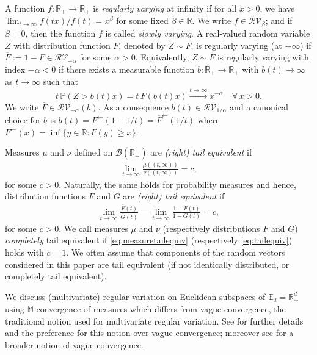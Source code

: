 \documentclass[aos]{imsart}
\numberwithin{equation}{section}
\theoremstyle{plain} %
\theoremstyle{remark}
\newcommand{\E}{\mathbb{E}}
\newcommand{\M}{\mathbb{M}}
\renewcommand\P{\mathbb{P}}
\newcommand{\R}{\mathbb{R}}
\def\RV{\mathcal{RV}}
\begin{document}
  A function $f: \R_{+} \to \R_{+}$ is \emph{regularly varying} at infinity if for all $x>0$, we have $\lim_{t\to\infty} f(tx)/f(t) =x^{\beta}$
for some fixed $\beta\in \R$. We write $f\in\RV_{\beta}$; and if $\beta=0$, then the  function $f$ is called \emph{slowly varying}.  A real-valued random variable $Z $ with distribution function $F$, denoted by $Z\sim F$,  is regularly varying (at $+\infty$) if $\overline{F}:= 1-F \in \RV_{-\alpha}$ for some $\alpha> 0$. Equivalently, $Z\sim F$ is regularly varying with index $-\alpha< 0$ if there exists a measurable function $b:\R_+\to\R_+$ with $b(t)\to \infty$ as $t\to\infty$ such that
\[t\,\P(Z>b(t)x) = t\,\overline{F}(b(t)x) \xrightarrow{t \to \infty} x^{-\alpha} \quad \forall\, x>0.\]
We write $\overline{F}\in \RV_{-\alpha}(b)$. As a consequence $b(t)\in \RV_{1/\alpha}$ and a canonical choice for $b$ is
$b(t)= F^{\leftarrow}(1-1/t)=\overline{F}^{\leftarrow}(1/t)$ where $F^{\leftarrow}(x)= \inf\{y\in\R:F(y)\ge x\}$.

Measures $\mu$ and $\nu$ defined on $\mathcal{B}(\R_+)$ are \emph{(right) tail equivalent} if
\begin{align}\label{eq:measuretailequiv}
    \lim_{t\to\infty}\frac{\mu((t,\infty))}{\nu((t,\infty))}  = c,
\end{align}
for some $c>0$.
Naturally, the same holds for probability measures and hence,
distribution functions $F$ and $G$ are \emph{(right) tail equivalent} if
\begin{align}\label{eq:tailequiv}
    \lim_{t\to\infty}\frac{\overline{F}(t)}{\overline{G}(t)} = \lim_{t\to\infty} \frac{1-{F}(t)}{1-{G}(t)} = c,
\end{align}
for some $c>0$.  We call measures $\mu$ and $\nu$ (respectively distributions $F$ and $G$) \emph{completely} tail equivalent if \eqref{eq:measuretailequiv} (respectively \eqref{eq:tailequiv}) holds with $c=1$. We often assume that components of the random vectors considered in this paper are tail equivalent (if not identically distributed, or completely tail equivalent).

We discuss (multivariate) regular variation  on Euclidean subspaces of $\E_d=\R_{+}^{d}$ using $\M$-convergence of measures  which differs from vague convergence, the traditional notion used for multivariate regular variation. See \cite{hult:lindskog:2006a,lindskog:resnick:roy:2014,das:fasen:kluppelberg:2022} for further details and the preference for this notion over vague convergence; moreover see \cite{basrak:planinic:2019} for a broader notion of vague convergence.
\end{document}
